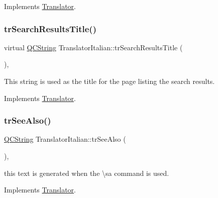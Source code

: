 Implements \mbox{\hyperlink{class_translator}{Translator}}.

\mbox{\label{class_translator_italian_a00cba20573d3f37349e23993fc1c689b}} 
\subsubsection{\texorpdfstring{trSearchResultsTitle()}{trSearchResultsTitle()}}
{\footnotesize\ttfamily virtual \mbox{\hyperlink{class_q_c_string}{Q\+C\+String}} Translator\+Italian\+::tr\+Search\+Results\+Title (\begin{DoxyParamCaption}{ }\end{DoxyParamCaption})\hspace{0.3cm}{\ttfamily [inline]}, {\ttfamily [virtual]}}

This string is used as the title for the page listing the search results. 

Implements \mbox{\hyperlink{class_translator}{Translator}}.

\mbox{\label{class_translator_italian_af113e12bf13877fd4f58037df2c96ae1}} 
\subsubsection{\texorpdfstring{trSeeAlso()}{trSeeAlso()}}
{\footnotesize\ttfamily \mbox{\hyperlink{class_q_c_string}{Q\+C\+String}} Translator\+Italian\+::tr\+See\+Also (\begin{DoxyParamCaption}{ }\end{DoxyParamCaption})\hspace{0.3cm}{\ttfamily [inline]}, {\ttfamily [virtual]}}

this text is generated when the \textbackslash{}sa command is used. 

Implements \mbox{\hyperlink{class_translator}{Translator}}.

\mbox{\label{class_translator_italian_aa464887e12556d927937937e9f4df7b6}} 
